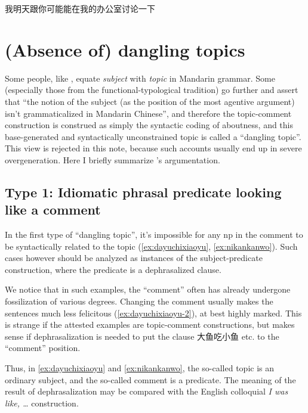 \documentclass[UTF8, a4paper, oneside, scheme=plain, 12pt]{ctexrep}
\newcommand*{\citesec}[1]{\S~{#1}}
\newcommand*{\term}[1]{\emph{#1}}
\newcommand{\form}[1]{\emph{#1}}
\begin{document}
\begin{exe}
    \ex 我明天跟你可能能在我的办公室讨论一下
\end{exe}

\section{(Absence of) dangling topics}\label{sec:topic-subject}

Some people, like \citet[\citesec{7.1}]{zhudexigrammar},
equate \term{subject} with \term{topic} in Mandarin grammar.
Some (especially those from the functional-typological tradition) go further 
and assert that ``the notion of the subject (as the position of the most agentive argument) 
isn't grammaticalized in Mandarin Chinese'',
and therefore the topic-comment construction 
is construed as simply the syntactic coding of aboutness,
and this base-generated and syntactically unconstrained topic 
is called a ``dangling topic''.
This view is rejected in this note,
because such accounts usually end up in severe overgeneration. 
Here I briefly summarize \citet{sih2000topic}'s argumentation.

\subsection{Type 1: Idiomatic phrasal predicate looking like a comment}\label{sec:clause.dangling-topic.1}

In the first type of ``dangling topic'',
it's impossible for any \acs{np} in the comment to be syntactically related to the topic
(\ref{ex:dayuchixiaoyu}, \ref{ex:nikankanwo}).
Such cases however should be analyzed as instances of the
subject-predicate construction,
where the predicate is a dephrasalized clause.

We notice that in such examples, 
the ``comment'' often has already undergone fossilization of various degrees.
Changing the comment usually makes the sentences much less felicitous 
(\ref{ex:dayuchixiaoyu-2}),
at best highly marked.
This is strange if the attested examples are topic-comment constructions,
but makes sense if dephrasalization is needed 
to put the clause 大鱼吃小鱼 etc. to the ``comment'' position.

Thus, in \eqref{ex:dayuchixiaoyu} and \eqref{ex:nikankanwo},
the so-called topic is an ordinary subject,
and the so-called comment is a predicate.
The meaning of the result of dephrasalization 
may be compared with the English colloquial 
\form{I was like, \dots} construction.
\end{document}
